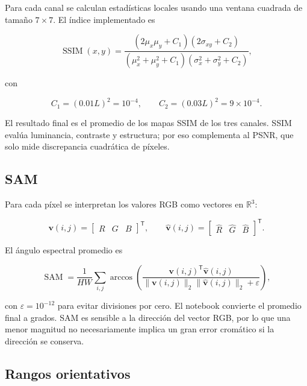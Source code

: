 \documentclass[11pt,a4paper]{article}
\begin{document}
Para cada canal se calculan estadísticas locales usando una ventana cuadrada de tamaño $7\times7$. El índice implementado es

\begin{equation}
 \operatorname{SSIM}(x,y)=
 \frac{(2\mu_x\mu_y+C_1)(2\sigma_{xy}+C_2)}
 {(\mu_x^2+\mu_y^2+C_1)(\sigma_x^2+\sigma_y^2+C_2)},
 \label{eq:ssim}
\end{equation}

con

\begin{equation}
 C_1=(0.01L)^2=10^{-4},\qquad C_2=(0.03L)^2=9\times10^{-4}.
 \label{eq:ssim-constants}
\end{equation}

El resultado final es el promedio de los mapas SSIM de los tres canales. SSIM evalúa luminancia, contraste y estructura; por eso complementa al PSNR, que solo mide discrepancia cuadrática de píxeles.

\subsection{SAM}

Para cada píxel se interpretan los valores RGB como vectores en $\mathbb{R}^3$:

\begin{equation}
 \mathbf v(i,j)=\begin{bmatrix}R&G&B\end{bmatrix}^{\mathsf T},\qquad
 \widehat{\mathbf v}(i,j)=\begin{bmatrix}\widehat R&\widehat G&\widehat B\end{bmatrix}^{\mathsf T}.
\end{equation}

El ángulo espectral promedio es

\begin{equation}
 \operatorname{SAM}=\frac{1}{HW}\sum_{i,j}
 \arccos\left(
 \frac{\mathbf v(i,j)^{\mathsf T}\widehat{\mathbf v}(i,j)}
 {\|\mathbf v(i,j)\|_2\|\widehat{\mathbf v}(i,j)\|_2+\varepsilon}
 \right),
 \label{eq:sam}
\end{equation}

con $\varepsilon=10^{-12}$ para evitar divisiones por cero. El notebook convierte el promedio final a grados. SAM es sensible a la dirección del vector RGB, por lo que una menor magnitud no necesariamente implica un gran error cromático si la dirección se conserva.

\subsection{Rangos orientativos}
\end{document}
